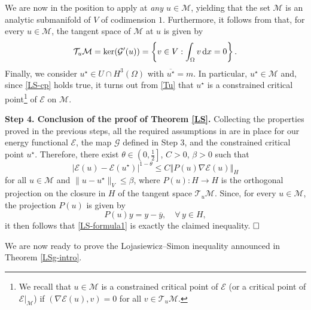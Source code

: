 \documentclass[11pt,reqno]{amsart}
\theoremstyle{remark}
\newcommand \norm[1] {\left\Vert #1\right\Vert}
\def\d{{\rm d}}
\def\E{\mathcal{E}}
\numberwithin{equation}{section}
\def\d{{\rm d}}
\begin{document}
We are now in the position to apply \cite[Theorem 3.1]{RUPP} at \emph{any $u\in \mathcal{M}$}, yielding that the set $\mathcal{M}$ is an analytic submanifold of $V$ of codimension $1$.
Furthermore, it follows from \cite[Proposition 3.3]{RUPP} that, for every $u\in \mathcal{M}$, the tangent space of $\mathcal{M}$ at $u$ is given by
\begin{equation}
\label{Tu}
\mathcal{T}_{u}\mathcal{M}=\ker(\mathcal{G}'(u))=\left\{v\in V:\int_\Omega v \, \d x=0\right\}.
\end{equation}
Finally, we consider $u^\star\in U\cap H^3(\Omega)$ with $\overline{u^\star}=m$. In particular, $u^\star\in \mathcal{M}$ and, since \eqref{LS-cp} holds true, it turns out from \eqref{Tu} that $u^\star$ is a constrained critical 
point\footnote{We recall that $u\in\mathcal{M}$ is a constrained critical point of $\mathcal{E}$ (or a critical point of $\mathcal{E}|_\mathcal{M}$) if
$(\nabla\mathcal{E}(u),v)=0$ for all $v\in \mathcal T_{u}\mathcal{M}$.}
of $\mathcal{E}$ on $\mathcal{M}$.
\medskip

{\bf Step 4. Conclusion of the proof of Theorem \ref{LS}.}
 Collecting the properties proved in the previous steps, all the required assumptions in \cite[Corollary 5.2]{RUPP} are in place for our energy functional $\mathcal{E}$, the map $\mathcal{G}$ defined in Step 3,
and the constrained critical point $u^\star$. Therefore, there exist $\theta \in \left(0,\frac12\right]$, $C>0$, $\beta>0$ such that
\begin{equation}
\label{LS-formula1}
| \E(u) - \E(u^\star)|^{1-\theta}
\leq C \norm{P(u)\nabla \E(u)}_{H}
\end{equation}
for all $u\in \mathcal{M}$ and
$\| u-u^\star\|_{V}\leq \beta$, where $P(u):H\to H$ is the orthogonal projection on the closure in $H$ of the tangent space $\mathcal{T}_{u}\mathcal{M}$.
Since, for every $u\in \mathcal{M}$, the projection $P(u)$ is given by
$$
P(u)y=y-\overline{y},\quad \forall \, y\in H,
$$
it then follows that \eqref{LS-formula1} is exactly the claimed inequality.
$\hfill \Box$

\bigskip

We are now ready to prove the Lojasiewicz–Simon inequality	 announced in Theorem \ref{LSg-intro}.
\end{document}

